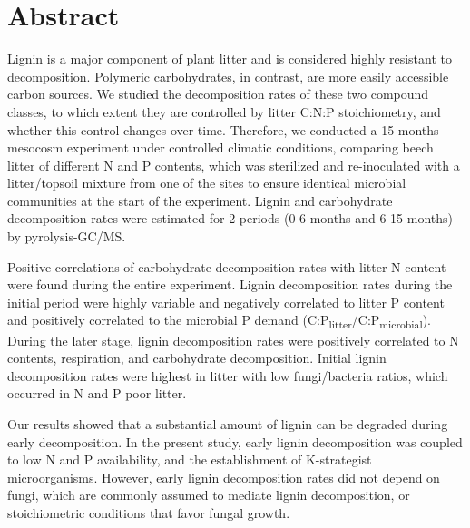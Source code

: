 \section*{Abstract}

Lignin is a major component of plant litter and is considered highly resistant to decomposition. Polymeric carbohydrates, in contrast, are more easily accessible carbon sources. We studied the decomposition rates of these two compound classes, to which extent they are controlled by litter C:N:P stoichiometry, and whether this control changes over time. Therefore, we conducted a 15-months mesocosm experiment under controlled climatic conditions, comparing beech litter of different N and P contents, which was sterilized and re-inoculated with a litter/topsoil mixture from one of the sites to ensure identical microbial communities at the start of the experiment. Lignin and carbohydrate decomposition rates were estimated for 2 periods (0-6 months and 6-15 months) by pyrolysis-GC/MS.

Positive correlations of carbohydrate decomposition rates with litter N content were found during the entire experiment. Lignin decomposition rates during the initial period were highly variable and negatively correlated to litter P content and positively correlated to the microbial P demand (C:P\textsubscript{litter}/C:P\textsubscript{microbial}). During the later stage, lignin decomposition rates were positively correlated to N contents, respiration, and carbohydrate decomposition. Initial lignin decomposition rates were highest in litter with low fungi/bacteria ratios, which occurred in N and P poor litter.

Our results showed that a substantial amount of lignin can be degraded during early decomposition. In the present study, early lignin decomposition was coupled to low N and P availability, and the establishment of K-strategist microorganisms. However, early lignin decomposition rates did not depend on fungi, which are commonly assumed to mediate lignin decomposition, or stoichiometric conditions that favor fungal growth. 